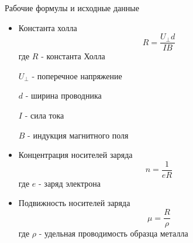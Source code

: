\documentclass[12pt]{article}
\begin{document}
    \begin{point}{Рабочие формулы и исходные данные}
        \begin{itemize}
            \item Константа холла
            \begin{equation}
                R = \frac{U_{\perp}d}{IB}
            \end{equation}
            где $R$ - константа Холла
            \par $U_{\perp}$ - поперечное напряжение
            \par $d$ - ширина проводника
            \par $I$ - сила тока
            \par $B$ - индукция магнитного поля

            \item Концентрация носителей заряда
            \begin{equation}
                n = \frac{1}{eR}
            \end{equation}
            где $e$ - заряд электрона

            \item Подвижность носителей заряда
            \begin{equation}
                \mu = \frac{R}{\rho}
            \end{equation}
            где $\rho$ - удельная проводимость образца металла
        \end{itemize}
    \end{point}
\end{document}
